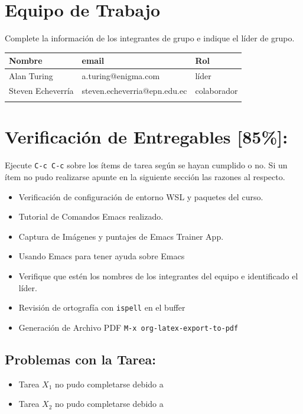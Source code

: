 \documentclass{article}
\begin{document}
\section{Equipo de Trabajo}
\label{sec:org38cf860}
Complete la información de los integrantes de grupo e indique el líder
de grupo.

\begin{center}
\begin{tabular}{lll}
\hline
Nombre & email & Rol\\[0pt]
\hline
Alan Turing & a.turing@enigma.com & líder\\[0pt]
Steven Echeverría & steven.echeverria@epn.edu.ec & colaborador\\[0pt]
 &  & \\[0pt]
\hline
\end{tabular}
\end{center}

\section{Verificación de Entregables [85\%]:}
\label{sec:org2e90098}
Ejecute \texttt{C-c C-c} sobre los ítems de tarea según se hayan cumplido o
no. Si un ítem no pudo realizarse apunte en la siguiente sección las
razones al respecto.
\begin{itemize}
\item[{$\boxtimes$}] Verificación de configuración de entorno WSL y paquetes del curso.
\item[{$\boxtimes$}] Tutorial de Comandos Emacs realizado.
\item[{$\boxtimes$}] Captura de Imágenes y puntajes de Emacs Trainer App.
\item[{$\boxtimes$}] Usando Emacs para tener ayuda sobre Emacs
\item[{$\square$}] Verifique que estén los nombres de los integrantes del equipo e
identificado el líder.
\item[{$\boxtimes$}] Revisión de ortografía con \texttt{ispell} en el buffer
\item[{$\boxtimes$}] Generación de Archivo PDF \texttt{M-x org-latex-export-to-pdf}
\end{itemize}
\subsection{Problemas con la Tarea:}
\label{sec:orge90a4c2}
\begin{itemize}
\item Tarea \(X_1\) no pudo completarse debido a
\item Tarea \(X_2\) no pudo completarse debido a
\end{itemize}
\end{document}
